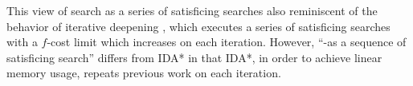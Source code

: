 





% 
% 


This view of \astar search as a series of satisficing searches also reminiscent of the behavior of 
iterative deepening \astar \cite{korf1985depth}, which executes a series of satisficing searches with a $f$-cost limit which increases on each iteration. 
However, ``\astar-as a sequence of satisficing search'' differs from IDA* in that IDA*, in order to achieve linear memory usage, repeats previous work on each iteration.

